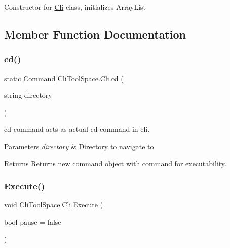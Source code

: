 Constructor for \mbox{\hyperlink{class_cli_tool_space_1_1_cli}{Cli}} class, initializes Array\+List 



\subsection{Member Function Documentation}
\mbox{\label{class_cli_tool_space_1_1_cli_a8d79672635592ff610653189fd7e6d15}} 
\subsubsection{\texorpdfstring{cd()}{cd()}}
{\footnotesize\ttfamily static \mbox{\hyperlink{class_cli_tool_space_1_1_command}{Command}} Cli\+Tool\+Space.\+Cli.\+cd (\begin{DoxyParamCaption}\item[{string}]{directory }\end{DoxyParamCaption})\hspace{0.3cm}{\ttfamily [static]}}



cd command acts as actual cd command in cli. 


\begin{DoxyParams}{Parameters}
{\em directory} & Directory to navigate to\\
\hline
\end{DoxyParams}
\begin{DoxyReturn}{Returns}
Returns new command object with command for executability.
\end{DoxyReturn}
\mbox{\label{class_cli_tool_space_1_1_cli_a8a2edf2f70eeb1ca7baae4d92e0a9ee5}} 
\subsubsection{\texorpdfstring{Execute()}{Execute()}}
{\footnotesize\ttfamily void Cli\+Tool\+Space.\+Cli.\+Execute (\begin{DoxyParamCaption}\item[{bool}]{pause = {\ttfamily false} }\end{DoxyParamCaption})}



